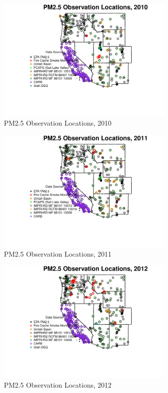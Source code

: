 \begin{figure} 
\centering  
\includegraphics[width=0.77\textwidth]{Code_Outputs/MapPM25_All_SitesY2010_ObsMapY2010.pdf} 
\caption{\label{fig:MapPM25_All_SitesY2010ObsMapY2010}PM2.5 Observation Locations, 2010} 
\end{figure} 
 

\begin{figure} 
\centering  
\includegraphics[width=0.77\textwidth]{Code_Outputs/MapPM25_All_SitesY2011_ObsMapY2011.pdf} 
\caption{\label{fig:MapPM25_All_SitesY2011ObsMapY2011}PM2.5 Observation Locations, 2011} 
\end{figure} 
 

\begin{figure} 
\centering  
\includegraphics[width=0.77\textwidth]{Code_Outputs/MapPM25_All_SitesY2012_ObsMapY2012.pdf} 
\caption{\label{fig:MapPM25_All_SitesY2012ObsMapY2012}PM2.5 Observation Locations, 2012} 
\end{figure} 
 

